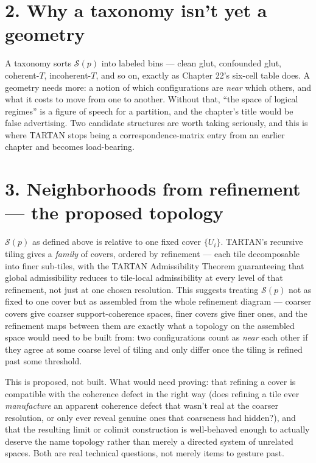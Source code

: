 \hypertarget{why-a-taxonomy-isnt-yet-a-geometry}{%
\section{2. Why a taxonomy isn't yet a geometry}\label{why-a-taxonomy-isnt-yet-a-geometry}}

A taxonomy sorts \(\mathcal{S}(p)\) into labeled bins --- clean glut,
confounded glut, coherent-\(T\), incoherent-\(T\), and so on, exactly as
Chapter 22's six-cell table does. A geometry needs more: a notion of which
configurations are \emph{near} which others, and what it costs to move from
one to another. Without that, ``the space of logical regimes'' is a
figure of speech for a partition, and the chapter's title would be false
advertising. Two candidate structures are worth taking seriously, and
this is where TARTAN stops being a correspondence-matrix entry from an
earlier chapter and becomes load-bearing.

\hypertarget{neighborhoods-from-refinement-the-proposed-topology}{%
\section{3. Neighborhoods from refinement --- the proposed topology}\label{neighborhoods-from-refinement-the-proposed-topology}}

\(\mathcal{S}(p)\) as defined above is relative to one fixed cover
\(\{U_i\}\). TARTAN's recursive tiling gives a \emph{family} of covers, ordered
by refinement --- each tile decomposable into finer sub-tiles, with the
TARTAN Admissibility Theorem guaranteeing that global admissibility
reduces to tile-local admissibility at every level of that refinement,
not just at one chosen resolution. This suggests treating \(\mathcal{S}(p)\)
not as fixed to one cover but as assembled from the whole refinement
diagram --- coarser covers give coarser support-coherence spaces, finer
covers give finer ones, and the refinement maps between them are exactly
what a topology on the assembled space would need to be built from:
two configurations count as \emph{near} each other if they agree at some
coarse level of tiling and only differ once the tiling is refined past
some threshold.

This is proposed, not built. What would need proving: that refining a
cover is compatible with the coherence defect in the right way (does
refining a tile ever \emph{manufacture} an apparent coherence defect that
wasn't real at the coarser resolution, or only ever reveal genuine ones
that coarseness had hidden?), and that the resulting limit or colimit
construction is well-behaved enough to actually deserve the name
topology rather than merely a directed system of unrelated spaces. Both
are real technical questions, not merely items to gesture past.

